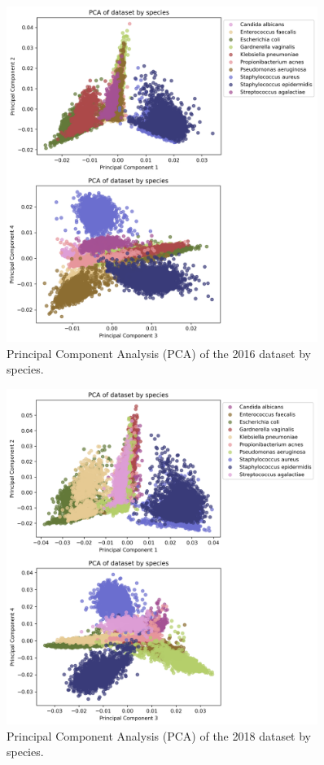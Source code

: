\documentclass[english,11pt,a4paper,titlepage]{article}
\begin{document}
\begin{figure}[h]
	\centering
	\includegraphics[width=0.9\textwidth]{img/PCA_species_2016.png}
	\caption{Principal Component Analysis (PCA) of the 2016 dataset by species.}
	\label{fig:pca_2016}
\end{figure}

\begin{figure}[h]
	\centering
	\includegraphics[width=0.9\textwidth]{img/PCA_species_2018.png}
	\caption{Principal Component Analysis (PCA) of the 2018 dataset by species.}
	\label{fig:pca_2018}
\end{figure}
\end{document}
